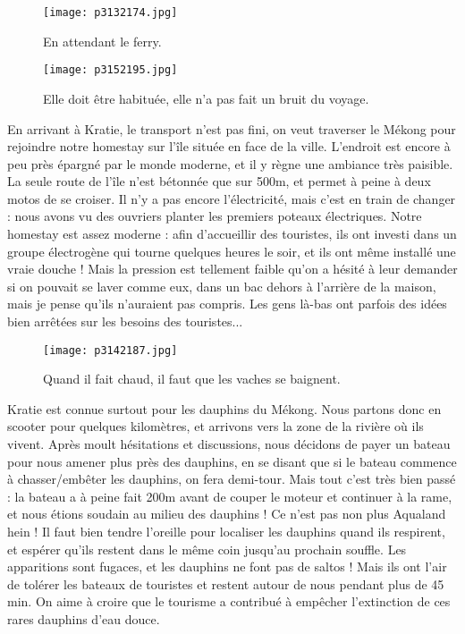 \documentclass{book}
\begin{document}
\begin{figure}[h]
\centering
\texttt{[image: p3132174.jpg]}
\caption*{En attendant le ferry.}
\end{figure}




\begin{figure}[h]
\centering
\texttt{[image: p3152195.jpg]}
\caption*{Elle doit être habituée, elle n'a pas fait un bruit du voyage.}
\end{figure}

En arrivant à Kratie, le transport n'est pas fini, on veut traverser le Mékong pour rejoindre notre homestay sur l'île située en face de la ville. L'endroit est encore à peu près épargné par le monde moderne, et il y règne une ambiance très paisible. La seule route de l'île n'est bétonnée que sur 500m, et permet à peine à deux motos de se croiser. Il n'y a pas encore l'électricité, mais c'est en train de changer : nous avons vu des ouvriers planter les premiers poteaux électriques. Notre homestay est assez moderne : afin d'accueillir des touristes, ils ont investi dans un groupe électrogène qui tourne quelques heures le soir, et ils ont même installé une vraie douche ! Mais la pression est tellement faible qu'on a hésité à leur demander si on pouvait se laver comme eux, dans un bac dehors à l'arrière de la maison, mais je pense qu'ils n'auraient pas compris. Les gens là-bas ont parfois des idées bien arrêtées sur les besoins des touristes...


\begin{figure}[h]
\centering
\texttt{[image: p3142187.jpg]}
\caption*{Quand il fait chaud, il faut que les vaches se baignent.}
\end{figure}

Kratie est connue surtout pour les dauphins du Mékong. Nous partons donc en scooter pour quelques kilomètres, et arrivons vers la zone de la rivière où ils vivent. Après moult hésitations et discussions, nous décidons de payer un bateau pour nous amener plus près des dauphins, en se disant que si le bateau commence à chasser/embêter les dauphins, on fera demi-tour. Mais tout c'est très bien passé : la bateau a à peine fait 200m avant de couper le moteur et continuer à la rame, et nous étions soudain au milieu des dauphins ! Ce n'est pas non plus Aqualand hein ! Il faut bien tendre l'oreille pour localiser les dauphins quand ils respirent, et espérer qu'ils restent dans le même coin jusqu'au prochain souffle. Les apparitions sont fugaces, et les dauphins ne font pas de saltos ! Mais ils ont l'air de tolérer les bateaux de touristes et restent autour de nous pendant plus de 45 min. On aime à croire que le tourisme a contribué à empêcher l'extinction de ces rares dauphins d'eau douce.
\end{document}
